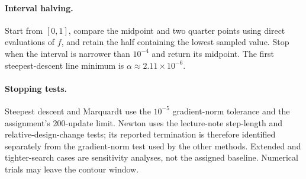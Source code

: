 \documentclass[11pt,a4paper]{article}
\begin{document}
\paragraph{Interval halving.} Start from $[0,1]$, compare the midpoint and
two quarter points using direct evaluations of $f$, and retain the half
containing the lowest sampled value. Stop when the interval is narrower than
$10^{-4}$ and return its midpoint. The first steepest-descent line minimum
is $\alpha\approx2.11\times10^{-6}$.

\paragraph{Stopping tests.} Steepest descent and Marquardt use the
$10^{-5}$ gradient-norm tolerance and the assignment's 200-update limit.
Newton uses the lecture-note step-length and relative-design-change tests;
its reported termination is therefore identified separately from the
gradient-norm test used by the other methods. Extended and tighter-search cases are sensitivity analyses,
not the assigned baseline. Numerical trials may leave the contour window.

\clearpage
\end{document}

